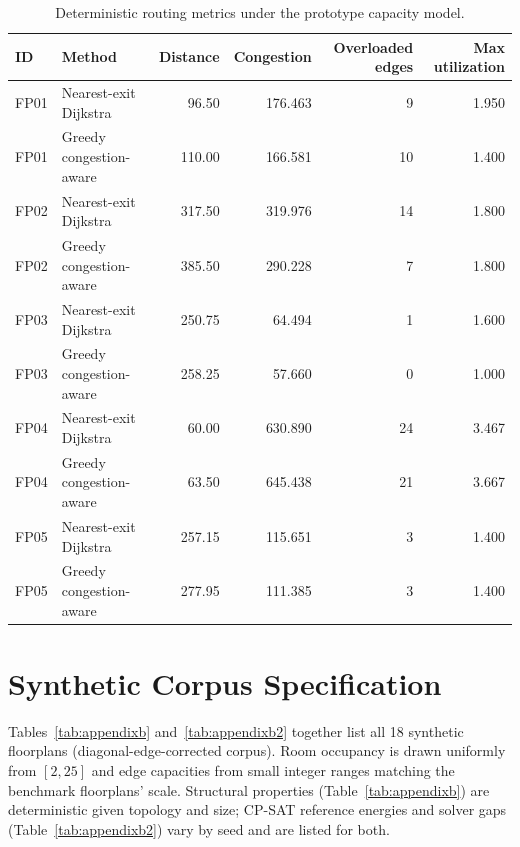 \documentclass[11pt]{article}
\begin{document}
\begin{table}[h]
\centering
\caption{Deterministic routing metrics under the prototype capacity model.}
\label{tab:appendixa}
\small
\begin{tabular}{llrrrr}
\toprule
ID & Method & Distance & Congestion & Overloaded edges & Max utilization \\
\midrule
FP01 & Nearest-exit Dijkstra & 96.50 & 176.463 & 9 & 1.950 \\
FP01 & Greedy congestion-aware & 110.00 & 166.581 & 10 & 1.400 \\
FP02 & Nearest-exit Dijkstra & 317.50 & 319.976 & 14 & 1.800 \\
FP02 & Greedy congestion-aware & 385.50 & 290.228 & 7 & 1.800 \\
FP03 & Nearest-exit Dijkstra & 250.75 & 64.494 & 1 & 1.600 \\
FP03 & Greedy congestion-aware & 258.25 & 57.660 & 0 & 1.000 \\
FP04 & Nearest-exit Dijkstra & 60.00 & 630.890 & 24 & 3.467 \\
FP04 & Greedy congestion-aware & 63.50 & 645.438 & 21 & 3.667 \\
FP05 & Nearest-exit Dijkstra & 257.15 & 115.651 & 3 & 1.400 \\
FP05 & Greedy congestion-aware & 277.95 & 111.385 & 3 & 1.400 \\
\bottomrule
\end{tabular}
\end{table}

\section{Synthetic Corpus Specification}
\label{sec:appendixB}
Tables~\ref{tab:appendixb} and~\ref{tab:appendixb2} together list all 18 synthetic floorplans (diagonal-edge-corrected corpus). Room occupancy is drawn uniformly from $[2,25]$ and edge capacities from small integer ranges matching the benchmark floorplans' scale. Structural properties (Table~\ref{tab:appendixb}) are deterministic given topology and size; CP-SAT reference energies and solver gaps (Table~\ref{tab:appendixb2}) vary by seed and are listed for both.
\end{document}
